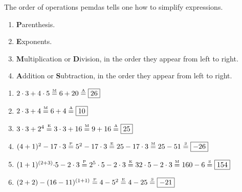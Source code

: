 \documentclass[crop=false,class=article,oneside]{standalone}
\begin{document}
        The order of operations \gls{pemdas} tells one
        how to simplify expressions.
        \begin{enumerate}
            \label{North_Shore_PEMDAS}
            \item \textbf{P}arenthesis.
            \item \textbf{E}xponents.
            \item \textbf{M}ultiplication or \textbf{D}ivision, 
                in the order they appear from left to right.
            \item \textbf{A}ddition or \textbf{S}ubtraction,
                in the order they appear from left to right.
        \end{enumerate}
        \begin{frameexample}{}{}
            \begin{enumerate}
                \item ${2}\cdot{3}+{4}\cdot{5}%
                       \overset{\textrm{\tiny{M}}}{=}%
                       6+20\overset{\textrm{\tiny{A}}}{=}%
                       \boxed{26}$
                \item ${2}\cdot{3}%
                       +4\overset{\textrm{\tiny{M}}}{=}%
                       6+4\overset{\textrm{\tiny{A}}}{=}%
                       \boxed{10}$
                \item ${3}\cdot{3+2^{4}}%
                       \overset{\textrm{\tiny{E}}}{=}%
                       {3}\cdot {3}+16%
                       \overset{\textrm{\tiny{M}}}{=}%
                       9+16\overset{\textrm{\tiny{A}}}{=}%
                       \boxed{25}$
                \item $(4+1)^2-17\cdot 3%
                    \overset{\textrm{\tiny{P}}}{=}%
                    5^{2}-17\cdot 3%
                    \overset{\textrm{\tiny{E}}}{=}25-17\cdot 3%
                    \overset{\textrm{\tiny{M}}}{=}25-51%
                    \overset{\textrm{\tiny{S}}}{=}\boxed{-26}$
                \item ${(1+1)^{(2+3)}\cdot}{5}-%
                       {2}\cdot{3}
                       \overset{\textrm{\tiny{P}}}{=}%
                       {2^{5}}\cdot{5}-{2}\cdot{3}%
                       \overset{\textrm{\tiny{E}}}{=}%
                       {32}\cdot{5}-{2}\cdot{3}%
                       \overset{\textrm{\tiny{M}}}{=}%
                       160-6\overset{\textrm{\tiny{S}}}{=}%
                       \boxed{154}$
                \item $(2+2)-(16-11)^{(1+1)}%
                       \overset{\textrm{\tiny{P}}}{=}4-5^{2}%
                       \overset{\textrm{\tiny{E}}}{=}4-25%
                       \overset{\textrm{\tiny{S}}}{=}%
                       \boxed{-21}$
            \end{enumerate}
        \end{frameexample}
\end{document}
